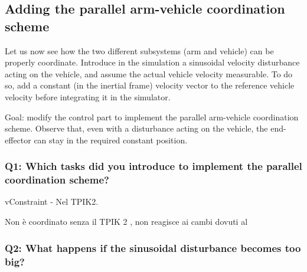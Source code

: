 \documentclass{article}
\begin{document}
\subsection{Adding the parallel arm-vehicle coordination scheme}
Let us now see how the two different subsystems (arm and vehicle) can be properly coordinate. Introduce in the simulation a sinusoidal velocity disturbance acting on the vehicle, and assume the actual vehicle velocity measurable. To do so, add a constant (in the inertial frame) velocity vector to the reference vehicle velocity before integrating it in the simulator. 

Goal: modify the control part to implement the parallel arm-vehicle coordination scheme. Observe that, even with a disturbance acting on the vehicle, the end-effector can stay in the required constant position.

\subsubsection{Q1: Which tasks did you introduce to implement the parallel coordination scheme?}

vConstraint - Nel TPIK2.

Non è coordinato senza il TPIK 2 , non reagisce ai cambi dovuti al 

\subsubsection{Q2: What happens if the sinusoidal disturbance becomes too big?}
\end{document}
